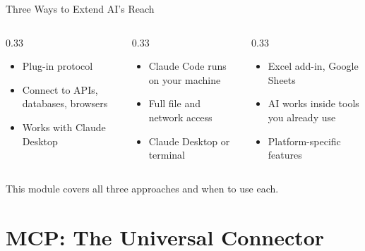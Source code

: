 \documentclass[aspectratio=169]{beamer}
\begin{document}
\begin{frame}{Three Ways to Extend AI's Reach}
\begin{columns}[T]
\begin{column}{0.33\textwidth}
\begin{shadedbox}[title=\textbf{MCP Servers}]
\begin{itemize}\small
  \item Plug-in protocol
  \item Connect to APIs, databases, browsers
  \item Works with Claude Desktop
\end{itemize}
\end{shadedbox}
\end{column}
\begin{column}{0.33\textwidth}
\begin{shadedbox}[title=\textbf{Code Execution}]
\begin{itemize}\small
  \item Claude Code runs on your machine
  \item Full file and network access
  \item Claude Desktop or terminal
\end{itemize}
\end{shadedbox}
\end{column}
\begin{column}{0.33\textwidth}
\begin{shadedbox}[title=\textbf{AI in Apps}]
\begin{itemize}\small
  \item Excel add-in, Google Sheets
  \item AI works inside tools you already use
  \item Platform-specific features
\end{itemize}
\end{shadedbox}
\end{column}
\end{columns}
\vspace{0.3cm}
This module covers all three approaches and when to use each.
\end{frame}

\section{MCP: The Universal Connector}
\end{document}

